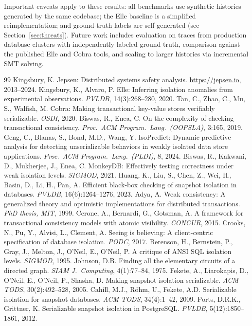 \documentclass[11pt]{article}
\begin{document}
Important caveats apply to these results: all benchmarks use synthetic
histories generated by the same codebase; the Elle baseline is a simplified
reimplementation; and ground-truth labels are self-generated (see
Section~\ref{sec:threats}).  Future work includes evaluation on traces
from production database clusters with independently labeled ground truth,
comparison against the published Elle and Cobra tools, and scaling to
larger histories via incremental SMT solving.


\begin{thebibliography}{99}
 Kingsbury, K. Jepsen: Distributed systems safety analysis. \url{https://jepsen.io}, 2013--2024.
 Kingsbury, K., Alvaro, P. Elle: Inferring isolation anomalies from experimental observations. \emph{PVLDB}, 14(3):268--280, 2020.
 Tan, C., Zhao, C., Mu, S., Walfish, M. Cobra: Making transactional key-value stores verifiably serializable. \emph{OSDI}, 2020.
 Biswas, R., Enea, C. On the complexity of checking transactional consistency. \emph{Proc.\ ACM Program.\ Lang.\ (OOPSLA)}, 3:165, 2019.
 Geng, C., Blanas, S., Bond, M.D., Wang, Y. IsoPredict: Dynamic predictive analysis for detecting unserializable behaviors in weakly isolated data store applications. \emph{Proc.\ ACM Program.\ Lang.\ (PLDI)}, 8, 2024.
 Biswas, R., Kakwani, D., Mukherjee, J., Enea, C. MonkeyDB: Effectively testing correctness under weak isolation levels. \emph{SIGMOD}, 2021.
 Huang, K., Liu, S., Chen, Z., Wei, H., Basin, D., Li, H., Pan, A. Efficient black-box checking of snapshot isolation in databases. \emph{PVLDB}, 16(6):1264--1276, 2023.
 Adya, A. Weak consistency: A generalized theory and optimistic implementations for distributed transactions. \emph{PhD thesis, MIT}, 1999.
 Cerone, A., Bernardi, G., Gotsman, A. A framework for transactional consistency models with atomic visibility. \emph{CONCUR}, 2015.
 Crooks, N., Pu, Y., Alvisi, L., Clement, A. Seeing is believing: A client-centric specification of database isolation. \emph{PODC}, 2017.
 Berenson, H., Bernstein, P., Gray, J., Melton, J., O'Neil, E., O'Neil, P. A critique of ANSI SQL isolation levels. \emph{SIGMOD}, 1995.
 Johnson, D.B. Finding all the elementary circuits of a directed graph. \emph{SIAM J.\ Computing}, 4(1):77--84, 1975.
 Fekete, A., Liarokapis, D., O'Neil, E., O'Neil, P., Shasha, D. Making snapshot isolation serializable. \emph{ACM TODS}, 30(2):492--528, 2005.
 Cahill, M.J., R\"ohm, U., Fekete, A.D. Serializable isolation for snapshot databases. \emph{ACM TODS}, 34(4):1--42, 2009.
 Ports, D.R.K., Grittner, K. Serializable snapshot isolation in PostgreSQL. \emph{PVLDB}, 5(12):1850--1861, 2012.
\end{thebibliography}
\end{document}
